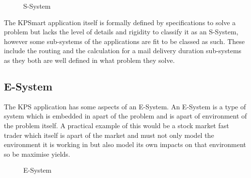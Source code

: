 \documentclass{style/CRPITStyle}
\begin{document}
\vspace{.1in}

\begin{figure}[htb]
\caption{\protect\label{s-system} S-System}
\end{figure}

\vspace{.1in}

The KPSmart application itself is formally defined by specifications to solve a
problem but lacks the level of details and rigidity to classify it as an
S-System, however some sub-systems of the applications are fit to be classed as such.
These include the routing and the calculation for a mail delivery duration
sub-systems as they both are well defined in what problem they solve.

\subsection{E-System}

The KPS application has some aspects of an E-System.
An E-System is a type of system which is embedded in apart of the problem and is
apart of environment of the problem itself. A practical example of this would be
a stock market fast trader which itself is apart of the market and must not only
model the environment it is working in but also model its own impacts on that
environment so be maximise yields.

\vspace{.1in}

\begin{figure}[htb]
\caption{\protect\label{e-system}  E-System }
\end{figure}
\end{document}
